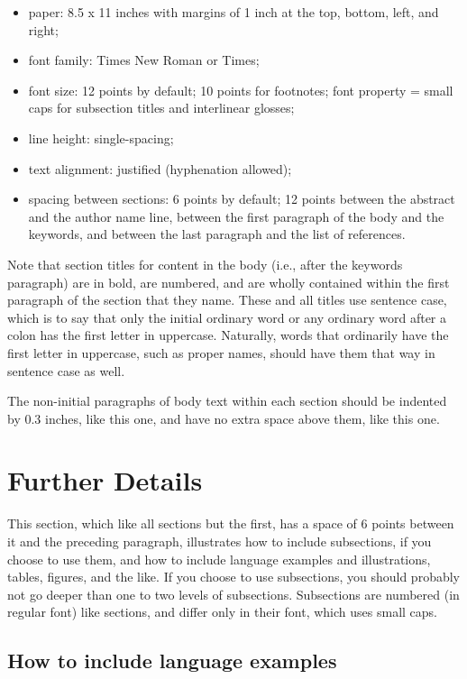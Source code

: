 \documentclass[12pt,letterpaper]{article}
\begin{document}
\begin{itemize}
\item	paper: 8.5 x 11 inches with margins of 1 inch at the top, bottom, left, and right;
\item	font family: Times New Roman or Times;
\item	font size: 12 points by default; 10 points for footnotes; font property = small caps for subsection titles and interlinear glosses;
\item	line height: single-spacing;
\item	text alignment: justified (hyphenation allowed);
\item	spacing between sections: 6 points by default; 12 points between the abstract and the author name line, between the first paragraph of the body and the keywords, and between the last paragraph and the list of references.
\end{itemize}

Note that section titles for content in the body (i.e., after the keywords paragraph) are in bold, are numbered, and are wholly contained within the first paragraph of the section that they name. These and all titles use sentence case, which is to say that only the initial ordinary word or any ordinary word after a colon has the first letter in uppercase. Naturally, words that ordinarily have the first letter in uppercase, such as proper names, should have them that way in sentence case as well.

The non-initial paragraphs of body text within each section should be indented by 0.3 inches, like this one, and have no extra space above them, like this one.
 
 
 
 \section{Further Details} 
This section, which like all sections but the first, has a space of 6 points between it and the preceding paragraph, illustrates how to include subsections, if you choose to use them, and how to include language examples and illustrations, tables, figures, and the like. If you choose to use subsections, you should probably not go deeper than one to two levels of subsections. Subsections are numbered (in regular font) like sections, and differ only in their font, which uses small caps.

\subsection{How to include language examples}
\end{document}
